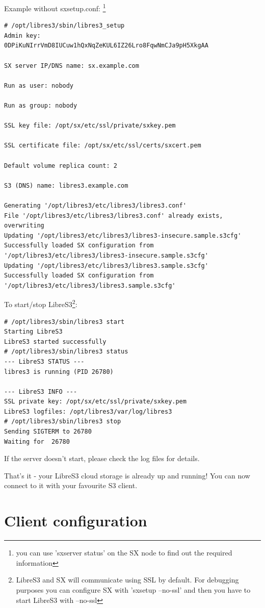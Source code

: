 Example without sxsetup.conf:
\footnote{you can use 'sxserver status' on the SX node to find out the required information}
\small
\begin{lstlisting}
# /opt/libres3/sbin/libres3_setup
Admin key:
0DPiKuNIrrVmD8IUCuw1hQxNqZeKUL6IZ26Lro8FqwNmCJa9pH5XkgAA

SX server IP/DNS name: sx.example.com

Run as user: nobody

Run as group: nobody

SSL key file: /opt/sx/etc/ssl/private/sxkey.pem

SSL certificate file: /opt/sx/etc/ssl/certs/sxcert.pem

Default volume replica count: 2

S3 (DNS) name: libres3.example.com

Generating '/opt/libres3/etc/libres3/libres3.conf'
File '/opt/libres3/etc/libres3/libres3.conf' already exists, overwriting
Updating '/opt/libres3/etc/libres3/libres3-insecure.sample.s3cfg'
Successfully loaded SX configuration from '/opt/libres3/etc/libres3/libres3-insecure.sample.s3cfg'
Updating '/opt/libres3/etc/libres3/libres3.sample.s3cfg'
Successfully loaded SX configuration from '/opt/libres3/etc/libres3/libres3.sample.s3cfg'
\end{lstlisting}
\LARGE

To start/stop LibreS3\footnote{LibreS3 and SX will communicate using SSL by
default. For debugging purposes you can configure SX with 'sxsetup --no-ssl' and then you have to start LibreS3 with --no-ssl}:

\small
\begin{lstlisting}
# /opt/libres3/sbin/libres3 start
Starting LibreS3
LibreS3 started successfully
# /opt/libres3/sbin/libres3 status
--- LibreS3 STATUS ---
libres3 is running (PID 26780)

--- LibreS3 INFO ---
SSL private key: /opt/sx/etc/ssl/private/sxkey.pem
LibreS3 logfiles: /opt/libres3/var/log/libres3
# /opt/libres3/sbin/libres3 stop
Sending SIGTERM to 26780
Waiting for  26780
\end{lstlisting}
\LARGE

If the server doesn't start, please check the log files for details.

That's it - your LibreS3 cloud storage is already up and running!
You can now connect to it with your favourite S3 client.

\chapter{Client configuration}
